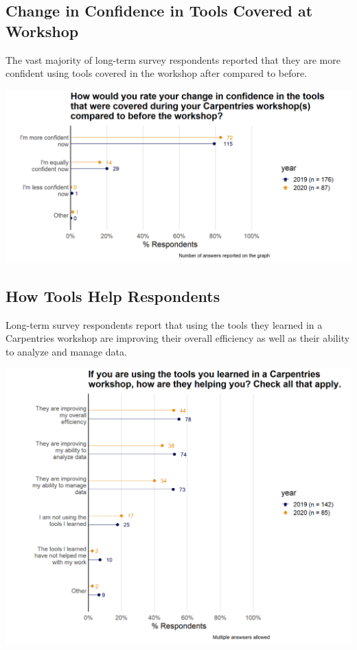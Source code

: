 \documentclass[
]{article}
\makeatletter
\def\maxwidth{\ifdim\Gin@nat@width>\linewidth\linewidth\else\Gin@nat@width\fi}
\makeatother
\begin{document}
\hypertarget{change-in-confidence-in-tools-covered-at-workshop}{%
\subsection{Change in Confidence in Tools Covered at
Workshop}\label{change-in-confidence-in-tools-covered-at-workshop}}

The vast majority of long-term survey respondents reported that they are
more confident using tools covered in the workshop after compared to
before.

\includegraphics[width=\maxwidth]{../figures/2020-12-longterm-change_confidence-1}

\hypertarget{how-tools-help-respondents}{%
\subsection{How Tools Help
Respondents}\label{how-tools-help-respondents}}

Long-term survey respondents report that using the tools they learned in
a Carpentries workshop are improving their overall efficiency as well as
their ability to analyze and manage data.

\includegraphics[width=\maxwidth]{../figures/2020-12-longterm-how_tools_help-1}
\end{document}
